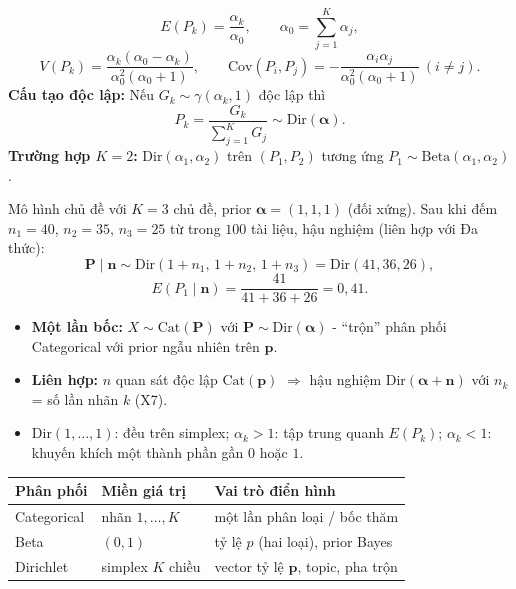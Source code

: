 \documentclass[12pt,a4paper]{article}
\begin{document}
\begin{dinhly}[title={Moment và quan hệ với Gamma}]
  \[
    E(P_k) = \frac{\alpha_k}{\alpha_0}, \qquad \alpha_0 = \sum_{j=1}^{K} \alpha_j,
  \]
  \[
    V(P_k) = \frac{\alpha_k(\alpha_0 - \alpha_k)}{\alpha_0^2(\alpha_0 + 1)}, \qquad
    \mathrm{Cov}(P_i, P_j) = -\frac{\alpha_i \alpha_j}{\alpha_0^2(\alpha_0+1)}\ (i \ne j).
  \]
  \textbf{Cấu tạo độc lập:} Nếu $G_k \sim \gamma(\alpha_k, 1)$ độc lập thì
  \[
    P_k = \frac{G_k}{\sum_{j=1}^{K} G_j} \sim \mathrm{Dir}(\boldsymbol{\alpha}).
  \]
  \textbf{Trường hợp $K=2$:} $\mathrm{Dir}(\alpha_1, \alpha_2)$ trên $(P_1, P_2)$ tương ứng $P_1 \sim \mathrm{Beta}(\alpha_1, \alpha_2)$.
\end{dinhly}

\begin{vidu}[title={Phân bố chủ đề đơn giản}]
Mô hình chủ đề với $K=3$ chủ đề, prior $\boldsymbol{\alpha} = (1,1,1)$ (đối xứng). Sau khi đếm $n_1=40$, $n_2=35$, $n_3=25$ từ trong $100$ tài liệu, hậu nghiệm (liên hợp với Đa thức):
\[
  \mathbf{P} \mid \mathbf{n} \sim \mathrm{Dir}(1+n_1,\, 1+n_2,\, 1+n_3) = \mathrm{Dir}(41, 36, 26),
\]
\[
  E(P_1 \mid \mathbf{n}) = \frac{41}{41+36+26} = 0{,}41.
\]
\end{vidu}

\begin{luuy}[title={Dirichlet và Categorical/Đa thức}]
  \begin{itemize}
    \item \textbf{Một lần bốc:} $X \sim \mathrm{Cat}(\mathbf{P})$ với $\mathbf{P} \sim \mathrm{Dir}(\boldsymbol{\alpha})$ - ``trộn'' phân phối Categorical với prior ngẫu nhiên trên $\mathbf{p}$.
    \item \textbf{Liên hợp:} $n$ quan sát độc lập $\mathrm{Cat}(\mathbf{p})$ $\Rightarrow$ hậu nghiệm $\mathrm{Dir}(\boldsymbol{\alpha} + \mathbf{n})$ với $n_k$ = số lần nhãn $k$ (X7).
    \item $\mathrm{Dir}(1,\ldots,1)$: đều trên simplex; $\alpha_k > 1$: tập trung quanh $E(P_k)$; $\alpha_k < 1$: khuyến khích một thành phần gần $0$ hoặc $1$.
  \end{itemize}
\end{luuy}

\begin{ynghia}[title={Ba phân phối trong chuỗi mô hình}]
  \begin{center}
  \renewcommand{\arraystretch}{1.2}
  \begin{tabular}{lll}
  \toprule
  \textbf{Phân phối} & \textbf{Miền giá trị} & \textbf{Vai trò điển hình} \\
  \midrule
  Categorical & nhãn $1,\ldots,K$ & một lần phân loại / bốc thăm \\
  Beta & $(0,1)$ & tỷ lệ $p$ (hai loại), prior Bayes \\
  Dirichlet & simplex $K$ chiều & vector tỷ lệ $\mathbf{p}$, topic, pha trộn \\
  \bottomrule
  \end{tabular}
  \end{center}
\end{ynghia}
\end{document}
